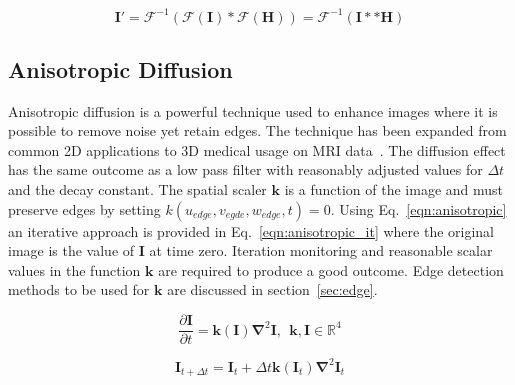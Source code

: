 \documentclass[journal]{IEEEtran}
\begin{document}

\begin{equation}
	\textbf{I}' = \mathcal{F}^{-1}(\mathcal{F}(\textbf{I})*\mathcal{F}(\textbf{H})) = \mathcal{F}^{-1}(\textbf{I}**\textbf{H})		%
	\label{eqn:same} 
\end{equation}


\subsection{Anisotropic Diffusion}
Anisotropic diffusion is a powerful technique used to enhance images where it is possible to remove noise yet retain edges.
The technique has been expanded from common 2D applications to 3D medical usage on MRI data~\cite{nakh11three}.
The diffusion effect has the same outcome as a low pass filter with reasonably adjusted values for $\Delta t$ and the decay constant.
The spatial scaler $\mathbf{k}$ is a function of the image and must preserve edges by setting $k(u_{edge},v_{egde},w_{edge},t) = 0$.
Using Eq.~\eqref{eqn:anisotropic} an iterative approach is provided in Eq.~\eqref{eqn:anisotropic_it} where the original image is the value of $\mathbf{I}$ at time zero.
Iteration monitoring and reasonable scalar values in the function $\mathbf{k}$ are required to produce a good outcome.
Edge detection methods to be used for $\mathbf{k}$ are discussed in section~\ref{sec:edge}.

\begin{equation}
	\frac{\partial \mathbf{I}}{\partial t} = \mathbf{k(\mathbf{I})} \mathbf{\nabla}^2 \mathbf{I},\:\:\mathbf{k},\mathbf{I} \in \mathbb{R}^4
	\label{eqn:anisotropic} 
\end{equation}

\begin{equation}
	\mathbf{I}_{t + \Delta t} = \mathbf{I}_t + \Delta t\mathbf{k}(\mathbf{I}_t)\mathbf{\nabla}^2\mathbf{I}_t
	\label{eqn:anisotropic_it} 
\end{equation}
\end{document}
